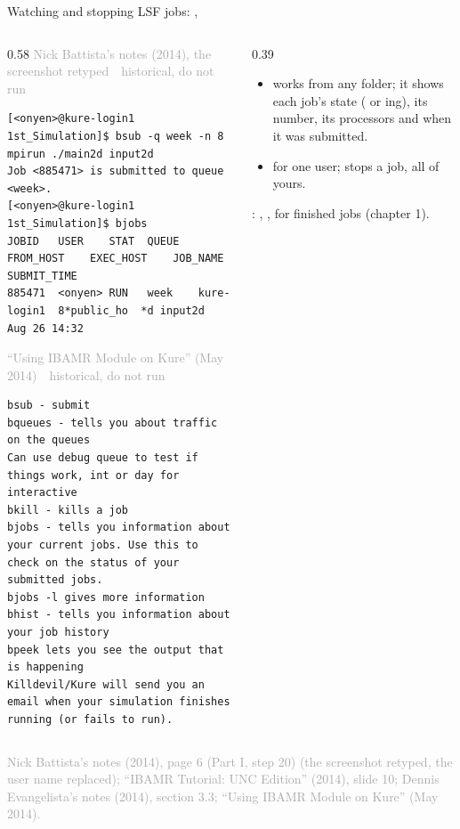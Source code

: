 \documentclass[aspectratio=169,11pt]{beamer}
\newcommand{\sourcecredit}[1]{\vfill\begin{flushright}\tiny\textcolor{DarkGray}{#1}\end{flushright}}
\newcommand{\hist}[1]{{\tiny\sffamily\textcolor{DarkGray}{#1\ \textbullet\ historical, do not run}}\par\nointerlineskip\vspace{0.3mm}}
\begin{document}
\begin{frame}[fragile]{Watching and stopping LSF jobs: , }
\label{fr:bjobs}
\begin{columns}[T,onlytextwidth]
\begin{column}{0.58\textwidth}
\hist{Nick Battista's notes (2014), the screenshot retyped}
\begin{lstlisting}[style=hist]
[<onyen>@kure-login1 1st_Simulation]$ bsub -q week -n 8 mpirun ./main2d input2d
Job <885471> is submitted to queue <week>.
[<onyen>@kure-login1 1st_Simulation]$ bjobs
JOBID   USER    STAT  QUEUE   FROM_HOST    EXEC_HOST    JOB_NAME    SUBMIT_TIME
885471  <onyen> RUN   week    kure-login1  8*public_ho  *d input2d  Aug 26 14:32
\end{lstlisting}
\hist{``Using IBAMR Module on Kure'' (May 2014)}
\begin{lstlisting}[style=hist]
bsub - submit
bqueues - tells you about traffic on the queues
Can use debug queue to test if things work, int or day for interactive
bkill - kills a job
bjobs - tells you information about your current jobs. Use this to check on the status of your submitted jobs.
bjobs -l gives more information
bhist - tells you information about your job history
bpeek lets you see the output that is happening
Killdevil/Kure will send you an email when your simulation finishes running (or fails to run).
\end{lstlisting}
\end{column}
\begin{column}{0.39\textwidth}
\footnotesize
\begin{itemize}\setlength{\itemsep}{2pt}
  \item {} works from any folder; it shows each job's state ( or ing), its number, its processors and when it was submitted.
  \item {} for one user;  stops a job,  all of yours.
\end{itemize}
\vspace{1mm}
: , ,  for finished jobs (chapter 1).
\end{column}
\end{columns}
\sourcecredit{Nick Battista's notes (2014), page 6 (Part I, step 20) (the screenshot retyped, the user name replaced); ``IBAMR Tutorial: UNC Edition'' (2014), slide 10; Dennis Evangelista's notes (2014), section 3.3; ``Using IBAMR Module on Kure'' (May 2014).}
\end{frame}
\end{document}

